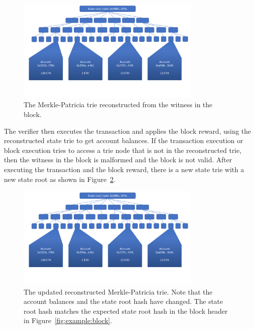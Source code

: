 \documentclass[12pt]{article}
\newcommand{\figurewidth}{0.8\textwidth}
\begin{document}
\begin{figure}[H]
  \centering
  \includegraphics[width=\figurewidth,page=5]{../figures/design/example.pdf}
  \caption{The Merkle-Patricia trie reconstructed from the witness in the block.}
  \label{fig:example:reconstructed}
\end{figure}

The verifier then executes the transaction and applies the block reward, using the reconstructed state trie to get account balances. If the transaction execution or block execution tries to access a trie node that is not in the reconstructed trie, then the witness in the block is malformed and the block is not valid. After executing the transaction and the block reward, there is a new state trie with a new state root as shown in Figure~\ref{fig:example:newconstructed}.

\begin{figure}[H]
  \centering
  \includegraphics[width=\figurewidth,page=6]{../figures/design/example.pdf}
  \caption{The updated reconstructed Merkle-Patricia trie. Note that the account balances and the state root hash have changed. The state root hash matches the expected state root hash in the block header in Figure~\ref{fig:example:block}.}
  \label{fig:example:newconstructed}
\end{figure}
\end{document}
